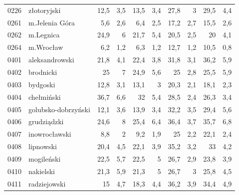 \begin{center}
\begin{longtable}{lp{3cm}rrrrrrrr}
0226 & złotoryjski             & 12,5    & 3,5         & 13,5     & 3,4          & 27,8     & 3            & 29,5     & 4,4          \\
0261 & m.Jelenia Góra          & 5,6     & 2,6         & 6,4      & 2,5          & 17,2     & 2,7          & 15,5     & 2,6          \\
0262 & m.Legnica               & 24,9    & 6           & 21,7     & 5,4          & 20,5     & 2,5          & 20       & 4,1          \\
0264 & m.Wrocław               & 6,2     & 1,2         & 6,3      & 1,2          & 12,7     & 1,2          & 10,5     & 0,8          \\
0401 & aleksandrowski          & 21,8    & 4,1         & 22,4     & 3,8          & 31,8     & 3,1          & 36,2     & 5,9          \\
0402 & brodnicki               & 25      & 7           & 24,9     & 5,6          & 25       & 2,8          & 25,5     & 5,9          \\
0403 & bydgoski                & 12,8    & 3,1         & 13,1     & 3            & 20,3     & 2,1          & 18,1     & 2,3          \\
0404 & chełmiński              & 36,7    & 6,6         & 32       & 5,4          & 28,5     & 2,4          & 26,3     & 3,4          \\
0405 & golubsko-dobrzyński     & 12,1    & 3,6         & 13,9     & 3,4          & 32,2     & 3,5          & 29,4     & 5,6          \\
0406 & grudziądzki             & 24,6    & 8           & 25,4     & 6,4          & 36,4     & 3,7          & 35,7     & 6,8          \\
0407 & inowrocławski           & 8,8     & 2           & 9,2      & 1,9          & 25       & 2,2          & 22,1     & 2,4          \\
0408 & lipnowski               & 20,4    & 4,5         & 22,1     & 3,9          & 35,2     & 3,2          & 33       & 4,2          \\
0409 & mogileński              & 22,5    & 5,7         & 22,5     & 5            & 26,7     & 2,9          & 23,8     & 3,9          \\
0410 & nakielski               & 21,3    & 5,9         & 21,3     & 5            & 26,7     & 3            & 25,8     & 4,5          \\
0411 & radziejowski            & 15      & 4,7         & 18,3     & 4,4          & 36,2     & 3,9          & 34,4     & 4,9          \\

\end{longtable}
\end{center}
